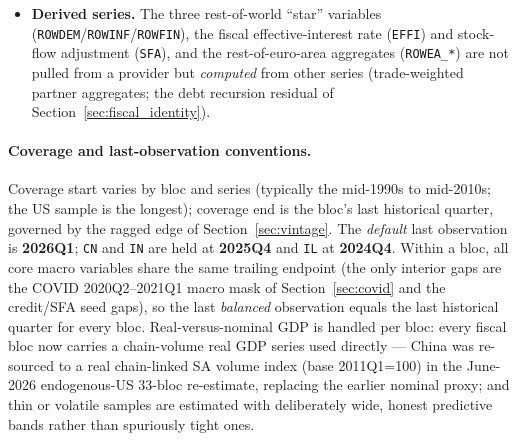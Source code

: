 \documentclass[11pt]{article}
\theoremstyle{definition}
\theoremstyle{remark}
\begin{document}
\begin{itemize}
    disaggregates IMF World Economic Outlook annual projections
    (\texttt{NGDP\_RPCH}, \texttt{PCPIPCH}) to fill the gap. WEO is a
    \emph{back-fill of last resort}, used only for the macro tail of blocs
    whose national source lags; it never overrides observed data and is
    flagged wherever it is the live tail (CN/IN; see below).
  \item \textbf{Derived series.} The three rest-of-world ``star''
    variables (\texttt{ROWDEM}/\texttt{ROWINF}/\texttt{ROWFIN}), the
    fiscal effective-interest rate (\texttt{EFFI}) and stock-flow
    adjustment (\texttt{SFA}), and the rest-of-euro-area aggregates
    (\texttt{ROWEA\_*}) are not pulled from a provider but \emph{computed}
    from other series (trade-weighted partner aggregates; the debt
    recursion residual of Section~\ref{sec:fiscal_identity}).
\end{itemize}

\paragraph{Coverage and last-observation conventions.} Coverage start
varies by bloc and series (typically the mid-1990s to mid-2010s; the US
sample is the longest); coverage end is the bloc's last historical
quarter, governed by the ragged edge of Section~\ref{sec:vintage}. The
\emph{default} last observation is \textbf{2026Q1}; \texttt{CN} and
\texttt{IN} are held at \textbf{2025Q4} and \texttt{IL} at \textbf{2024Q4}.
Within a bloc, all core macro variables share the same trailing endpoint
(the only interior gaps are the COVID 2020Q2--2021Q1 macro mask of
Section~\ref{sec:covid} and the credit/SFA seed gaps), so the last
\emph{balanced} observation equals the last historical quarter for every
bloc. Real-versus-nominal GDP is handled per bloc: every fiscal bloc now
carries a chain-volume real GDP series used directly --- China was
re-sourced to a real chain-linked SA volume index (base 2011Q1=100) in the
June-2026 endogenous-US 33-bloc re-estimate, replacing the earlier nominal
proxy; and thin or volatile samples are estimated with deliberately wide,
honest predictive bands rather than spuriously tight ones.
\end{document}
